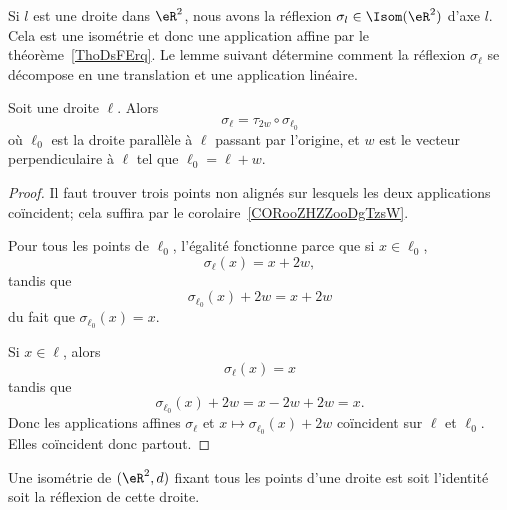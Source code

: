 \begin{normaltext}
	Si \( l\) est une droite dans \( \eR^2\), nous avons la réflexion \( \sigma_l\in\Isom(\eR^2)\) d'axe \( l\). Cela est une isométrie et donc une application affine par le théorème~\ref{ThoDsFErq}. Le lemme suivant détermine comment la réflexion \( \sigma_{\ell}\) se décompose en une translation et une application linéaire.
\end{normaltext}

\begin{lemma}   \label{LEMooVOJLooCFgdNG}
	Soit une droite \( \ell\). Alors
	\begin{equation}
		\sigma_{\ell}=\tau_{2w}\circ\sigma_{\ell_0}
	\end{equation}
	où \( \ell_0\) est la droite parallèle à \( \ell\) passant par l'origine, et \( w\) est le vecteur perpendiculaire à \( \ell\) tel que \( \ell_0=\ell+w\).
\end{lemma}

\begin{proof}
	Il faut trouver trois points non alignés sur lesquels les deux applications coïncident; cela suffira par le corolaire~\ref{CORooZHZZooDgTzsW}.

	Pour tous les points de \( \ell_0\), l'égalité fonctionne parce que si \( x\in\ell_0\),
	\begin{equation}
		\sigma_{\ell}(x)=x+2w,
	\end{equation}
	tandis que
	\begin{equation}
		\sigma_{\ell_0}(x)+2w=x+2w
	\end{equation}
	du fait que \( \sigma_{\ell_0}(x)=x\).

	Si \( x\in\ell\), alors
	\begin{equation}
		\sigma_{\ell}(x)=x
	\end{equation}
	tandis que
	\begin{equation}
		\sigma_{\ell_0}(x)+2w=x-2w+2w=x.
	\end{equation}
	Donc les applications affines \( \sigma_{\ell}\) et \( x\mapsto \sigma_{\ell_0}(x)+2w\) coïncident sur \( \ell\) et \( \ell_0\). Elles coïncident donc partout.
\end{proof}

\begin{lemma}		\label{LEMooRVKEooSlIrIR}
	Une isométrie de \( (\eR^2,d)\) fixant tous les points d'une droite est soit l'identité soit la réflexion de cette droite.
\end{lemma}

